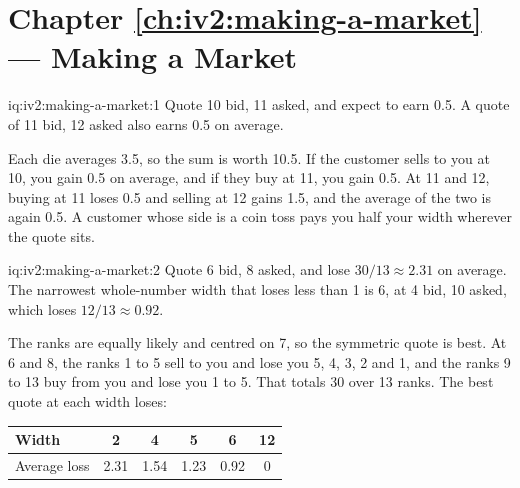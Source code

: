 \section*{Chapter \ref{ch:iv2:making-a-market} --- Making a Market}

\begin{solution}{iq:iv2:making-a-market:1}
Quote 10 bid, 11 asked, and expect to earn 0.5. A quote of 11 bid, 12 asked also earns 0.5 on average.

Each die averages 3.5, so the sum is worth 10.5. If the customer sells to you at 10, you gain 0.5 on average, and if they buy at 11, you gain 0.5. At 11 and 12, buying at 11 loses 0.5 and selling at 12 gains 1.5, and the average of the two is again 0.5. A customer whose side is a coin toss pays you half your width wherever the quote sits.

\end{solution}

\begin{solution}{iq:iv2:making-a-market:2}
Quote 6 bid, 8 asked, and lose $30/13 \approx 2.31$ on average. The narrowest whole-number width that loses less than 1 is 6, at 4 bid, 10 asked, which loses $12/13 \approx 0.92$.

The ranks are equally likely and centred on 7, so the symmetric quote is best. At 6 and 8, the ranks 1 to 5 sell to you and lose you 5, 4, 3, 2 and 1, and the ranks 9 to 13 buy from you and lose you 1 to 5. That totals 30 over 13 ranks. The best quote at each width loses:
\begin{center}\small
\begin{tabular}{@{}lccccc@{}}
Width & 2 & 4 & 5 & 6 & 12 \\ \hline
Average loss & 2.31 & 1.54 & 1.23 & 0.92 & 0
\end{tabular}
\end{center}

\end{solution}

